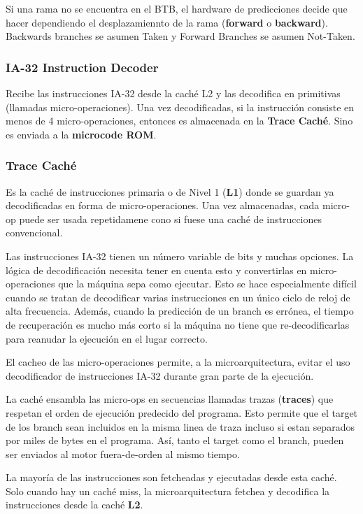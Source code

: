 Si una rama no se encuentra en el BTB, el hardware de predicciones decide que hacer dependiendo el desplazamiennto de la rama (\textbf{forward} o \textbf{backward}). Backwards branches se asumen Taken y Forward Branches se asumen Not-Taken.

\subsubsection*{IA-32 Instruction Decoder}
Recibe las instrucciones IA-32 desde la caché L2 y las decodifica en primitivas (llamadas micro-operaciones). Una vez decodificadas, si la instrucción consiste en menos de 4 micro-operaciones, entonces es almacenada en la \textbf{Trace Caché}. Sino es enviada a la \textbf{microcode ROM}.

\subsubsection*{Trace Caché} 
Es la caché de instrucciones primaria o de Nivel 1 (\textbf{L1}) donde se guardan ya decodificadas en forma de micro-operaciones. Una vez almacenadas, cada micro-op puede ser usada repetidamene cono si fuese una caché de instrucciones convencional.

Las instrucciones IA-32 tienen un número variable de bits y muchas opciones. La lógica de decodificación necesita tener en cuenta esto y convertirlas en micro-operaciones que la máquina sepa como ejecutar. Esto se hace especialmente difícil cuando se tratan de decodificar varias instrucciones en un único ciclo de reloj de alta frecuencia. Además, cuando la predicción de un branch es errónea, el tiempo de recuperación es mucho más corto si la máquina no tiene que re-decodificarlas para reanudar la ejecución en el lugar correcto.
	
El cacheo de las micro-operaciones permite, a la microarquitectura, evitar el uso decodificador de instrucciones IA-32 durante gran parte de la ejecución.

La caché ensambla las micro-ops en secuencias llamadas trazas (\textbf{traces}) que respetan el orden de ejecución predecido del programa. Esto permite que el target de los branch sean incluidos en la misma linea de traza incluso si estan separados por miles de bytes en el programa. Así, tanto el target como el branch, pueden ser enviados al motor fuera-de-orden al mismo tiempo.

La mayoría de las instrucciones son fetcheadas y ejecutadas desde esta caché. Solo cuando hay un caché miss, la microarquitectura fetchea y decodifica la instrucciones desde la caché \textbf{L2}.

